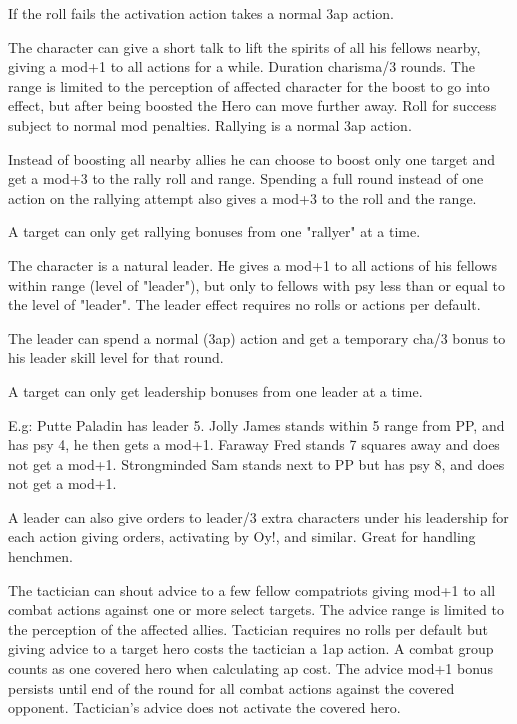If the roll fails the activation action takes a normal 3ap action.


 The character can give a short talk to lift the spirits of all his fellows nearby, giving a mod+1 to all actions for a while. Duration charisma/3 rounds. The range is limited to the perception of affected character for the boost to go into effect, but after being boosted the Hero can move further away. Roll for success subject to normal mod penalties. Rallying is a normal 3ap action.

Instead of boosting all nearby allies he can choose to boost only one target and get a mod+3 to the rally roll and range. Spending a full round instead of one action on the rallying attempt also gives a mod+3 to the roll and the range.

A target can only get rallying bonuses from one "rallyer" at a time.


 The character is a natural leader. He gives a mod+1 to all actions of his fellows within range (level of "leader"), but only to fellows with psy less than or equal to the level of "leader". The leader effect requires no rolls or actions per default.

The leader can spend a normal (3ap) action and get a temporary cha/3 bonus to his leader skill level for that round.

A target can only get leadership bonuses from one leader at a time.

E.g: Putte Paladin has leader 5. Jolly James stands within 5 range from PP, and has psy 4, he then gets a mod+1. Faraway Fred stands 7 squares away and does not get a mod+1. Strongminded Sam stands next to PP but has psy 8, and does not get a mod+1.

A leader can also give orders to leader/3 extra characters under his leadership for each action giving orders, activating by Oy!, and similar. Great for handling henchmen.


 The tactician can shout advice to a few fellow compatriots giving mod+1 to all combat actions against one or more select targets. The advice range is limited to the perception of the affected allies. Tactician requires no rolls per default but giving advice to a target hero costs the tactician a 1ap action. A combat group counts as one covered hero when calculating ap cost. The advice mod+1 bonus persists until end of the round for all combat actions against the covered opponent. Tactician's advice does not activate the covered hero. 

